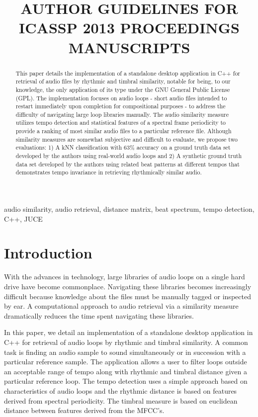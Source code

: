 \documentclass{article}
\title{AUTHOR GUIDELINES FOR ICASSP 2013 PROCEEDINGS MANUSCRIPTS}
\begin{document}
%
\maketitle
%
\begin{abstract}
This paper details the implementation of a standalone desktop application in C++ for retrieval of audio files by rhythmic and timbral similarity, notable for being, to our knowledge, the only application of its type under the GNU General Public License (GPL). The implementation focuses on audio loops - short audio files intended to restart immediately upon completion for compositional purposes - to address the difficulty of navigating large loop libraries manually. The audio similarity measure utilizes tempo detection and statistical features of a spectral frame periodicity to provide a ranking of most similar audio files to a particular reference file. Although similarity measures are somewhat subjective and difficult to evaluate, we propose two evaluations: 1) A kNN classification with 63\% accuracy on a ground truth data set developed by the authors using real-world audio loops and 2) A synthetic ground truth data set developed by the authors using related beat patterns at different tempos that demonstrates tempo invariance in retrieving rhythmically similar audio. \cite{audiocompare}
\end{abstract}
%
\begin{keywords}
audio similarity, audio retrieval, distance matrix, beat spectrum, tempo detection, C++, JUCE
\end{keywords}
%
\section{Introduction}

With the advances in technology, large libraries of audio loops on a single hard drive have become commonplace. Navigating these libraries becomes increasingly difficult because knowledge about the files must be manually tagged or inspected by ear. A computational approach to audio retrieval via a similarity measure dramatically reduces the time spent navigating these libraries.

In this paper, we detail an implementation of a standalone desktop application in C++ for retrieval of audio loops by rhythmic and timbral similarity. A common task is finding an audio sample to sound simultaneously or in succession with a particular reference sample. The application allows a user to filter loops outside an acceptable range of tempo along with rhythmic and timbral distance given a particular reference loop. The tempo detection uses a simple approach based on characteristics of audio loops and the rhythmic distance is based on features derived from spectral periodicity. The timbral measure is based on euclidean distance between features derived from the MFCC’s.
\end{document}
